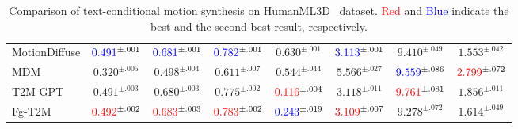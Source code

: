 \documentclass[10pt,twocolumn,letterpaper]{article}
\begin{document}
\begin{table}[t]
{\begin{tabular}{@{}lccccccc@{}}
MotionDiffuse \cite{zhang2022motiondiffuse}&
$\textcolor{blue}{0.491}^{\pm.001}$ &
$\textcolor{blue}{0.681}^{\pm.001}$ &
$\textcolor{blue}{0.782}^{\pm.001}$ &
$0.630^{\pm.001}$ &
$\textcolor{blue}{3.113}^{\pm.001}$ &
$9.410^{\pm.049}$ &
$1.553^{\pm.042}$ \\
MDM \cite{tevet2022human}&
$0.320^{\pm.005}$ &
$0.498^{\pm.004}$ &
$0.611^{\pm.007}$ &
$0.544^{\pm.044}$ &
$5.566^{\pm.027}$ &
$\textcolor{blue}{9.559}^{\pm.086}$ &
$\textcolor{red}{2.799}^{\pm.072}$ \\
T2M-GPT \cite{zhang2023t2m}&
$0.491^{\pm.003}$ &
$0.680^{\pm.003}$ &
$0.775^{\pm.002}$ &
$\textcolor{red}{0.116}^{\pm.004}$ &
$3.118^{\pm.011}$ &
$\textcolor{red}{9.761}^{\pm.081}$ &
$1.856^{\pm.011}$ \\
\midrule
\midrule
Fg-T2M  &
$\textcolor{red}{0.492}^{\pm.002}$ &
$\textcolor{red}{0.683}^{\pm.003}$ &
$\textcolor{red}{0.783}^{\pm.002}$ &
$\textcolor{blue}{0.243}^{\pm.019}$ &
$\textcolor{red}{3.109}^{\pm.007}$ &
$9.278^{\pm.072}$ &
$1.614^{\pm.049}$ \\
\bottomrule
\end{tabular}}
\vspace{-6pt}
\caption{Comparison of text-conditional motion synthesis on HumanML3D~\cite{guo2022generating} dataset. \textcolor{red}{Red} and \textcolor{blue}{Blue} indicate the best and the second-best result, respectively.}
\label{compare_humanml3d}
\end{table}
\end{document}
